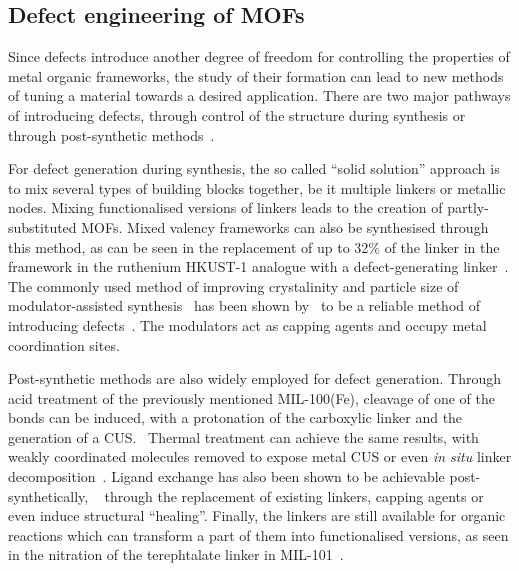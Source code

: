 \subsection{Defect engineering of MOFs}

Since defects introduce another degree of freedom
for controlling the properties of metal organic frameworks, the
study of their formation can lead to new methods of tuning
a material towards a desired application.
There are two major pathways of introducing defects, through
control of the structure during synthesis or through post-synthetic
methods~\cite{fangDefectEngineeredMetalOrganicFrameworks2015}.

For defect generation during synthesis, the so called
``solid solution'' approach is to mix several types of
building blocks together, be it multiple linkers or
metallic nodes. Mixing functionalised versions of linkers
leads to the creation of partly-substituted MOFs.
Mixed valency frameworks can also be synthesised through
this method, as can be seen in the replacement of up to 32\% of the
linker in the framework in the ruthenium HKUST-1
analogue with a defect-generating
linker~\cite{zhangRutheniumMetalOrganicFrameworks2016}.
The commonly used method of improving crystalinity and
particle size of modulator-assisted
synthesis~\cite{schaateModulatedSynthesisZrBased2011} has been shown
by~\citeauthor{shearerDefectEngineeringTuning2016}
to be a reliable method of introducing
defects~\cite{shearerDefectEngineeringTuning2016}.
The modulators act as capping agents and occupy metal coordination sites.

Post-synthetic methods are also widely employed for defect
generation. Through acid treatment of the previously mentioned
MIL-100(Fe), cleavage of one of the  bonds can be
induced, with a protonation of the carboxylic linker and the
generation of a CUS.~\cite{vermoorteleTuningCatalyticPerformance2012}
Thermal treatment can achieve the same results, with weakly coordinated
molecules removed to expose metal CUS or even \textit{in situ}
linker decomposition~\cite{gadipelliPostsynthesisAnnealingMOF52014}.
Ligand exchange has also been shown to be achievable post-synthetically,
~\cite{shearerFunctionalizingDefectsPostsynthetic2016} through the
replacement of existing linkers, capping agents or even induce
structural ``healing''. Finally, the linkers are still available 
for organic reactions which can transform a part of them into
functionalised versions, as seen in the nitration of the 
terephtalate linker in MIL-101~\cite{berntDirectCovalentPostsynthetic2011}.

